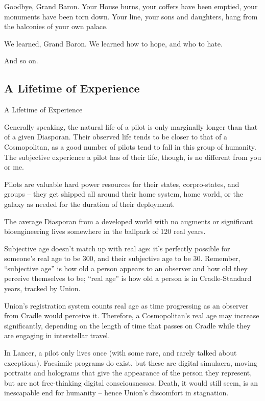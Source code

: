 Goodbye, Grand Baron. Your House burns, your coffers have been emptied, your monuments  
have been torn down. Your line, your sons and daughters, hang from the balconies of your own  
palace.   

We learned, Grand Baron. We learned how to hope, and who to hate.  

And so on.   
\subsection{A Lifetime of Experience}
A Lifetime of Experience  

Generally speaking, the natural life of a pilot is only marginally longer than that of a given  
Diasporan. Their observed life tends to be closer to that of a Cosmopolitan, as a good number of  
pilots tend to fall in this group of humanity. The subjective experience a pilot has of their life,  
though, is no different from you or me. 
 

Pilots are valuable hard power resources for their states, corpro-states, and groups -- they get  
shipped all around their home system, home world, or the galaxy as needed for the duration of  
their deployment. 
 

The average Diasporan from a developed world with no augments or significant bioengineering  
lives somewhere in the ballpark of 120 real years. 
 

Subjective age doesn’t match up with real age: it’s perfectly possible for someone’s real age to  
be 300, and their subjective age to be 30. Remember, “subjective age” is how old a person  
appears to an observer and how old they perceive themselves to be; “real age” is how old a  
person is in Cradle-Standard years, tracked by Union. 
 

                                                                                                           


Union’s registration system counts real age as time progressing as an observer from Cradle  
would perceive it. Therefore, a Cosmopolitan’s real age may increase significantly, depending on  
the length of time that passes on Cradle while they are engaging in interstellar travel.  
 

In Lancer, a pilot only lives once (with some rare, and rarely talked about exceptions). Facsimile  
programs do exist, but these are digital simulacra, moving portraits and holograms that give the  
appearance of the person they represent, but are not free-thinking digital consciousnesses.  
Death, it would still seem, is an inescapable end for humanity -- hence Union’s discomfort in  
stagnation. 
 
